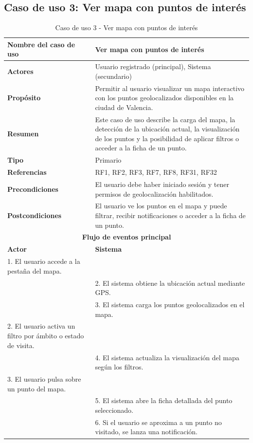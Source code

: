 \clearpage
\subsection{Caso de uso 3: Ver mapa con puntos de interés}

\begin{table}[H]
\centering
\caption{Caso de uso 3 - Ver mapa con puntos de interés}
\begin{tabular}{|p{4.5cm}|p{10.5cm}|}
\hline
\textbf{Nombre del caso de uso} & Ver mapa con puntos de interés \\
\hline
\textbf{Actores} & Usuario registrado (principal), Sistema (secundario) \\
\hline
\textbf{Propósito} & Permitir al usuario visualizar un mapa interactivo con los puntos geolocalizados disponibles en la ciudad de Valencia. \\
\hline
\textbf{Resumen} & Este caso de uso describe la carga del mapa, la detección de la ubicación actual, la visualización de los puntos y la posibilidad de aplicar filtros o acceder a la ficha de un punto. \\
\hline
\textbf{Tipo} & Primario \\
\hline
\textbf{Referencias} & RF1, RF2, RF3, RF7, RF8, RF31, RF32 \\
\hline
\textbf{Precondiciones} & El usuario debe haber iniciado sesión y tener permisos de geolocalización habilitados. \\
\hline
\textbf{Postcondiciones} & El usuario ve los puntos en el mapa y puede filtrar, recibir notificaciones o acceder a la ficha de un punto. \\
\hline
\multicolumn{2}{|c|}{\textbf{Flujo de eventos principal}} \\
\hline
\textbf{Actor} & \textbf{Sistema} \\
\hline
1. El usuario accede a la pestaña del mapa. & \\
\hline
& 2. El sistema obtiene la ubicación actual mediante GPS. \\
\hline
& 3. El sistema carga los puntos geolocalizados en el mapa. \\
\hline
2. El usuario activa un filtro por ámbito o estado de visita. & \\
\hline
& 4. El sistema actualiza la visualización del mapa según los filtros. \\
\hline
3. El usuario pulsa sobre un punto del mapa. & \\
\hline
& 5. El sistema abre la ficha detallada del punto seleccionado. \\
\hline
& 6. Si el usuario se aproxima a un punto no visitado, se lanza una notificación. \\
\hline
\end{tabular}
\end{table}


